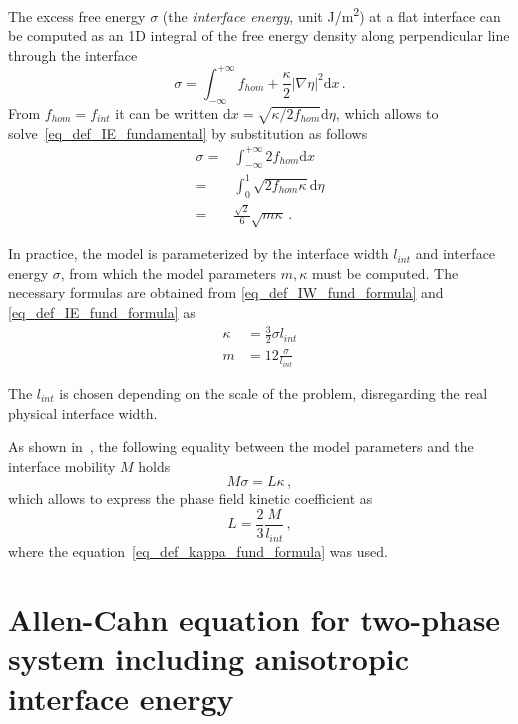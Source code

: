 The excess free energy $\sigma$ (the \textit{interface energy}, unit \unit{\J/\m^2}) at a flat interface can be computed as an 1D integral of the free energy density  along perpendicular line through the interface
\begin{equation} \label{eq_def_IE_fundamental}
	\sigma = \int_{-\infty}^{+\infty} f_{hom} + \frac{\kappa}{2}|\nabla\eta|^2 \mathrm{d}x \,.
\end{equation}
From $f_{hom}=f_{int}$ it can be written $\mathrm{d}x = \sqrt{\kappa/2 f_{hom}}\mathrm{d}\eta$, which allows to solve~\eqref{eq_def_IE_fundamental} by substitution as follows
\begin{align} 
	\sigma =& \int_{-\infty}^{+\infty} 2f_{hom} \mathrm{d}x \\
			=& \int_{0}^{1} \sqrt{2 f_{hom}\kappa} \mathrm{d}\eta \\ 
\label{eq_def_IE_fund_formula}			
			=& \frac{\sqrt{2}}{6}\sqrt{m\kappa}  \,. 
\end{align}

In practice, the model is parameterized by the interface width $l_{int}$ and interface energy $\sigma$, from which the model parameters $m,\kappa $ must be computed. The necessary formulas are obtained from \eqref{eq_def_IW_fund_formula} and \eqref{eq_def_IE_fund_formula} as
\begin{align}
\label{eq_def_kappa_fund_formula} 	\kappa 	&= \frac{3}{2}\sigma l_{int} \\
			m 		&= 12\frac{\sigma}{l_{int}}
\end{align}

The $l_{int}$ is chosen depending on the scale of the problem, disregarding the real physical interface width. 

As shown in~\cite{Moelans2008}, the following equality between the model parameters and the interface mobility $M$ holds
\begin{equation}
	M\sigma = L\kappa \,,
\end{equation}
which allows to express the phase field kinetic coefficient as
\begin{equation}\label{eq_def_L_fund_formula}
	L = \frac{2}{3}\frac{M}{l_{int}}\,,
\end{equation}
where the equation~\eqref{eq_def_kappa_fund_formula} was used.


\section{Allen-Cahn equation for two-phase system including anisotropic interface energy} \label{sec_intro_anisoIE_in_PF}
